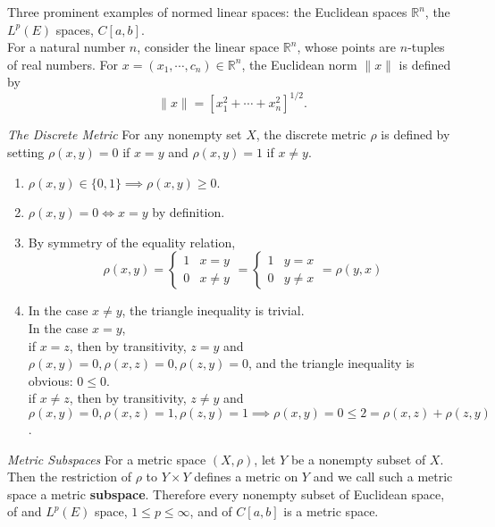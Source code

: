 \begin{flushleft}
Three prominent examples of normed linear spaces:
the Euclidean spaces $\mathbb{R}^n$, 
the $L^p(E)$ spaces,
$C[a,b]$.\\

For a natural number $n$, consider the linear space $\mathbb{R}^n$, whose points are $n$-tuples of real numbers.
For $x=(x_1,\cdots,c_n)\in\mathbb{R}^n$, the Euclidean norm $\|x\|$ is defined by
\[
    \|x\|=[x_1^2+\cdots+x_n^2]^{1/2}.    
\]
\par\medskip

\textit{The Discrete Metric}
For any nonempty set $X$, the discrete metric $\rho$ is defined by setting $\rho(x,y)=0$ if $x=y$ and $\rho(x,y)=1$ if $x\neq y$.
\begin{enumerate}[label=(\roman*),align=right]
    \item $\rho(x,y)\in\{0,1\}\implies\rho(x,y)\ge0$.
    \item $\rho(x,y)=0\iff x=y$ by definition.
    \item By symmetry of the equality relation,
    \[
    \rho(x,y)=
    \begin{cases}
        1 &x=y\\
        0 &x\neq y
    \end{cases}    
    =
    \begin{cases}
        1 &y=x\\
        0 &y\neq x
    \end{cases}  
    = \rho(y,x)
    \]
    \item In the case $x\neq y$, the triangle inequality is trivial.\\
    In the case $x=y$,\\
    if $x=z$, then by transitivity, $z=y$ and\\$\rho(x,y)=0,\rho(x,z)=0,\rho(z,y)=0$, and the triangle inequality is obvious: $0\le0$.\\
    if $x\neq z$, then by transitivity, $z\neq y$ and\\$\rho(x,y)=0,\rho(x,z)=1,\rho(z,y)=1 \implies \rho(x,y)=0\le2=\rho(x,z)+\rho(z,y)$.
\end{enumerate}
\par\medskip

\textit{Metric Subspaces}
For a metric space $(X,\rho)$, let $Y$ be a nonempty subset of $X$. 
Then the restriction of $\rho$ to $Y \times Y$ defines a metric on $Y$ and we call such a metric space a metric \textbf{subspace}.
Therefore every nonempty subset of Euclidean space, of and $L^p(E)$ space, $1\le p\le\infty$, and of $C[a,b]$ is a metric space.
\par\medskip


\end{flushleft}
